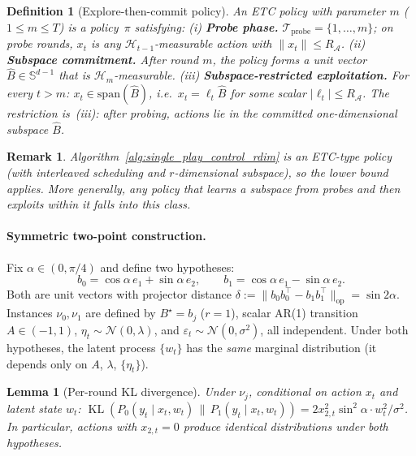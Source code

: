 \documentclass{article}
\newcommand{\op}{\mathrm{op}}
\newcommand{\cA}{\mathcal{A}}
\newcommand{\cH}{\mathcal{H}}
\newcommand{\cTprobe}{\mathcal{T}_{\mathrm{probe}}}
\newcommand{\Span}{\mathrm{span}}
\DeclareMathOperator{\KL}{KL}
\newtheorem{definition}{Definition}
\newtheorem{lemma}{Lemma}
\newtheorem{remark}{Remark}
\begin{document}
\begin{definition}[Explore-then-commit policy]
\label{def:etc_policy}
An \emph{ETC policy with parameter $m$} ($1 \le m \le T$) is a policy~$\pi$ satisfying:
(i) \textbf{Probe phase.} $\cTprobe = \{1,\ldots,m\}$; on probe rounds, $x_t$ is any $\cH_{t-1}$-measurable action with $\|x_t\| \le R_{\cA}$.
(ii) \textbf{Subspace commitment.} After round $m$, the policy forms a unit vector $\hat{B} \in \mathbb{S}^{d-1}$ that is $\cH_m$-measurable.
(iii) \textbf{Subspace-restricted exploitation.} For every $t > m$: $x_t \in \Span(\hat{B})$, i.e.\ $x_t = \ell_t \hat{B}$ for some scalar $|\ell_t| \le R_{\cA}$.
The restriction is~(iii): after probing, actions lie in the committed one-dimensional subspace $\hat{B}$.
\end{definition}

\begin{remark}
Algorithm~\ref{alg:single_play_control_rdim} is an ETC-type policy (with interleaved scheduling and $r$-dimensional subspace), so the lower bound applies.
More generally, any policy that learns a subspace from probes and then exploits within it falls into this class.
\end{remark}

\paragraph{Symmetric two-point construction.}
Fix $\alpha \in (0, \pi/4)$ and define two hypotheses:
\begin{equation}
\label{eq:two_point_hyp}
  b_0 = \cos\alpha\, e_1 + \sin\alpha\, e_2,
  \qquad
  b_1 = \cos\alpha\, e_1 - \sin\alpha\, e_2.
\end{equation}
Both are unit vectors with projector distance $\delta := \|b_0 b_0^\top - b_1 b_1^\top\|_{\op} = \sin 2\alpha$.
Instances $\nu_0, \nu_1$ are defined by $B^\star = b_j$ ($r=1$), scalar AR(1) transition $A \in (-1,1)$, $\eta_t \sim \mathcal{N}(0,\lambda)$, and $\varepsilon_t \sim \mathcal{N}(0,\sigma^2)$, all independent.
Under both hypotheses, the latent process $\{w_t\}$ has the \emph{same} marginal distribution (it depends only on $A$, $\lambda$, $\{\eta_t\}$).

\begin{lemma}[Per-round KL divergence]
\label{lem:kl_per_round}
Under $\nu_j$, conditional on action $x_t$ and latent state $w_t$:
$\KL(P_0(y_t\mid x_t,w_t)\,\|\,P_1(y_t\mid x_t,w_t)) = 2x_{2,t}^2\sin^2\!\alpha\cdot w_t^2/\sigma^2$.
In particular, actions with $x_{2,t}=0$ produce identical distributions under both hypotheses.
\end{lemma}
\end{document}
